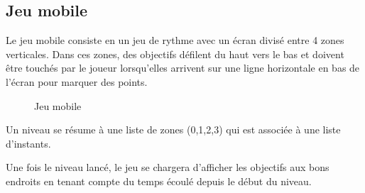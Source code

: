 \subsection{Jeu mobile}
Le jeu mobile consiste en un jeu de rythme avec un écran divisé entre 4 zones verticales. Dans ces zones, des objectifs défilent du haut vers le bas et doivent être touchés par le joueur lorsqu'elles arrivent sur une ligne horizontale en bas de l'écran pour marquer des points.

\begin{figure}[h]
\begin{center}
\end{center}
\caption{Jeu mobile}
\end{figure}

Un niveau se résume à une liste de zones (0,1,2,3) qui est associée à une liste d'instants.

Une fois le niveau lancé, le jeu se chargera d'afficher les objectifs aux bons endroits en tenant compte du temps écoulé depuis le début du niveau.

